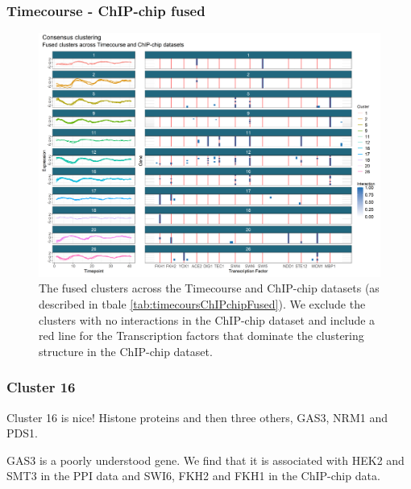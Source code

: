 \documentclass[]{article}
\begin{document}
\subsubsection{Timecourse - ChIP-chip fused}

\begin{figure}
	\centering
	\includegraphics[scale=0.6]{./Images/Yeast/timecourseChIPchipFused.png}
	\caption{The fused clusters across the Timecourse and ChIP-chip datasets (as described in tbale \ref{tab:timecoursChIPchipFused}). We exclude the clusters with no interactions in the ChIP-chip dataset and include a red line for the Transcription factors that dominate the clustering structure in the ChIP-chip dataset.}
	\label{fig:timepointChIPchipFused}
\end{figure}


\subsubsection{Cluster 16}
Cluster 16 is nice! Histone proteins and then three others, GAS3, NRM1 and PDS1.

GAS3 is a poorly understood gene. We find that it is associated with HEK2 and SMT3 in the PPI data and SWI6, FKH2 and FKH1 in the ChIP-chip data. 
\end{document}
